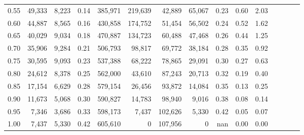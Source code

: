 \begin{tabular}{rrrcrrrrrrrrrrr}
0.55 &  49,333 &  8,223 &                                       0.14 &  385,971 &  219,639 &   42,889 &   65,067 &  0.23 &  0.60 &                         2.03 \\
0.60 &  44,887 &  8,565 &                                       0.16 &  430,858 &  174,752 &   51,454 &   56,502 &  0.24 &  0.52 &                         1.62 \\
0.65 &  40,029 &  9,034 &                                       0.18 &  470,887 &  134,723 &   60,488 &   47,468 &  0.26 &  0.44 &                         1.25 \\
0.70 &  35,906 &  9,284 &                                       0.21 &  506,793 &   98,817 &   69,772 &   38,184 &  0.28 &  0.35 &                         0.92 \\
0.75 &  30,595 &  9,093 &                                       0.23 &  537,388 &   68,222 &   78,865 &   29,091 &  0.30 &  0.27 &                         0.63 \\
0.80 &  24,612 &  8,378 &                                       0.25 &  562,000 &   43,610 &   87,243 &   20,713 &  0.32 &  0.19 &                         0.40 \\
0.85 &  17,154 &  6,629 &                                       0.28 &  579,154 &   26,456 &   93,872 &   14,084 &  0.35 &  0.13 &                         0.25 \\
0.90 &  11,673 &  5,068 &                                       0.30 &  590,827 &   14,783 &   98,940 &    9,016 &  0.38 &  0.08 &                         0.14 \\
0.95 &   7,346 &  3,686 &                                       0.33 &  598,173 &    7,437 &  102,626 &    5,330 &  0.42 &  0.05 &                         0.07 \\
1.00 &   7,437 &  5,330 &                                       0.42 &  605,610 &        0 &  107,956 &        0 &   nan &  0.00 &                         0.00 \\
\bottomrule
\end{tabular}
